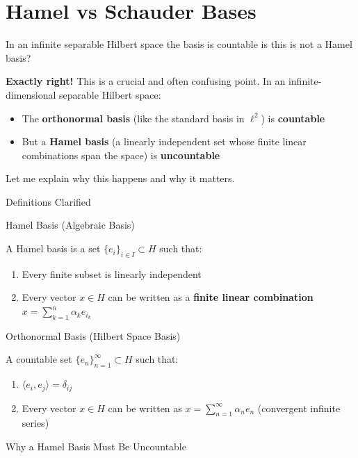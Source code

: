 \documentclass[aps,preprint]{revtex4}
\newenvironment{question}
  {\begin{tcolorbox}[colback=blue!5!white,colframe=blue!75!black,title=Question]}
  {\end{tcolorbox}}
\newenvironment{answer}
  {\begin{tcolorbox}[colback=green!5!white,colframe=green!75!black,title=Answer]}
  {\end{tcolorbox}}
\begin{document}
\section{Hamel vs Schauder Bases}

\begin{question}
In an infinite separable Hilbert space the basis is countable is this is not
a Hamel basis?
\end{question}

\begin{answer}
\textbf{Exactly right!} This is a crucial and often confusing point. In an
infinite-dimensional separable Hilbert space:

\begin{itemize}
\item The \textbf{orthonormal basis} (like the standard basis in $\ell^2$)
is \textbf{countable}

\item But a \textbf{Hamel basis} (a linearly independent set whose finite
linear combinations span the space) is \textbf{uncountable}
\end{itemize}

Let me explain why this happens and why it matters.

Definitions Clarified

Hamel Basis (Algebraic Basis)

A Hamel basis is a set $\{e_i\}_{i \in I} \subset H$ such that:

\begin{enumerate}
\item Every finite subset is linearly independent

\item Every vector $x \in H$ can be written as a \textbf{finite linear
combination} $x = \sum_{k=1}^n \alpha_k e_{i_k}$
\end{enumerate}

Orthonormal Basis (Hilbert Space Basis)

A countable set $\{e_n\}_{n=1}^\infty \subset H$ such that:

\begin{enumerate}
\item $\langle e_i, e_j \rangle = \delta_{ij}$

\item Every vector $x \in H$ can be written as $x = \sum_{n=1}^\infty
\alpha_n e_n$ (convergent infinite series)
\end{enumerate}

Why a Hamel Basis Must Be Uncountable


\end{answer}
\end{document}
